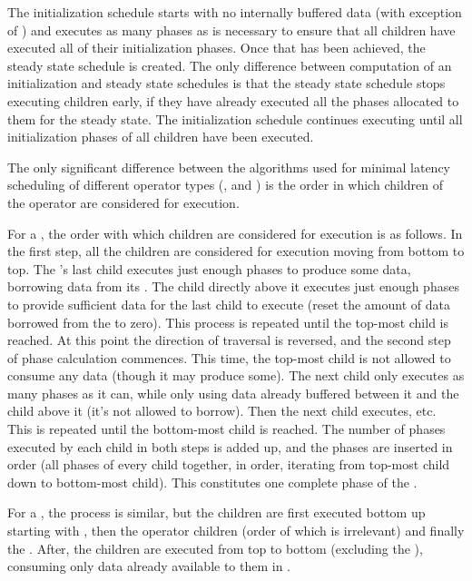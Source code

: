 The initialization schedule starts with no internally buffered
data (with exception of {\feedbackloops}) and executes as many
phases as is necessary to ensure that all children have executed
all of their initialization phases. Once that has been achieved,
the steady state schedule is created. The only difference between
computation of an initialization and steady state schedules is
that the steady state schedule stops executing children early, if
they have already executed all the phases allocated to them for
the steady state. The initialization schedule continues executing
until all initialization phases of all children have been
executed.

The only significant difference between the algorithms used for
minimal latency scheduling of different operator types
({\pipeline}, {\splitjoin} and {\feedbackloop}) is the order in
which children of the operator are considered for execution.

For a {\pipeline}, the order with which children are considered
for execution is as follows.  In the first step, all the children
are considered for execution moving from bottom to top. The
{\pipeline}'s last child executes just enough phases to produce
some data, borrowing data from its {\Input} {\Channel}. The child
directly above it executes just enough phases to provide
sufficient data for the last child to execute (reset the amount of
data borrowed from the {\Channel} to zero). This process is
repeated until the top-most child is reached. At this point the
direction of traversal is reversed, and the second step of phase
calculation commences. This time, the top-most child is not
allowed to consume any data (though it may produce some). The next
child only executes as many phases as it can, while only using
data already buffered between it and the child above it (it's not
allowed to borrow). Then the next child executes, etc. This is
repeated until the bottom-most child is reached. The number of
phases executed by each child in both steps is added up, and the
phases are inserted in order (all phases of every child together,
in order, iterating from top-most child down to bottom-most
child). This constitutes one complete phase of the {\pipeline}.

For a {\splitjoin}, the process is similar, but the children are
first executed bottom up starting with {\joiner}, then the
operator children (order of which is irrelevant) and finally the
{\splitter}. After, the children are executed from top to bottom
(excluding the {\splitter}), consuming only data already available
to them in {\Channels}.

